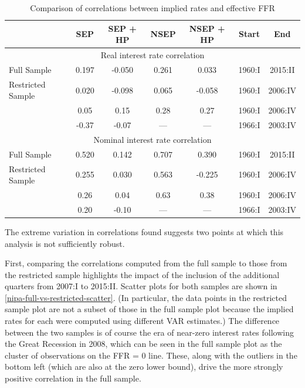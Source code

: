 \begin{table}[t]
\centering
\caption{Comparison of correlations between implied rates and effective FFR}
\label{correlation-comparison-nipa}
\begin{tabular}{lcccccc} \hline
                   & SEP   & SEP + HP & NSEP  & NSEP + HP & Start  & End \\ \hline
\multicolumn{7}{c}{Real interest rate correlation} \\ \hline
Full Sample        & 0.197 & -0.050   & 0.261 & 0.033     & 1960:I & 2015:II \\
Restricted Sample  & 0.020 & -0.098   & 0.065 & -0.058    & 1960:I & 2006:IV \\
\cite{collard11}   & 0.05  & 0.15     & 0.28  & 0.27      & 1960:I & 2006:IV \\
\cite{canzoneri07} & -0.37 & -0.07    & ---   & ---       & 1966:I & 2003:IV \\ \hline
\multicolumn{7}{c}{Nominal interest rate correlation} \\ \hline
Full Sample        & 0.520 & 0.142    & 0.707 & 0.390     & 1960:I & 2015:II \\
Restricted Sample  & 0.255 & 0.030    & 0.563 & -0.225    & 1960:I & 2006:IV \\
\cite{collard11}   & 0.26  & 0.04     & 0.63  & 0.38      & 1960:I & 2006:IV \\
\cite{canzoneri07} & 0.20  & -0.10    & ---   & ---       & 1966:I & 2003:IV \\ \hline
\end{tabular}
\end{table}

The extreme variation in correlations found suggests two points at which this analysis is not sufficiently robust.

First, comparing the correlations computed from the full sample to those from the restricted sample highlights the impact of the inclusion of the additional quarters from 2007:I to 2015:II. Scatter plots for both samples are shown in \autoref{nipa-full-vs-restricted-scatter}. (In particular, the data points in the restricted sample plot are not a subset of those in the full sample plot because the implied rates for each were computed using different VAR estimates.) The difference between the two samples is of course the era of near-zero interest rates following the Great Recession in 2008, which can be seen in the full sample plot as the cluster of observations on the FFR = 0 line. These, along with the outliers in the bottom left (which are also at the zero lower bound), drive the more strongly positive correlation in the full sample.

